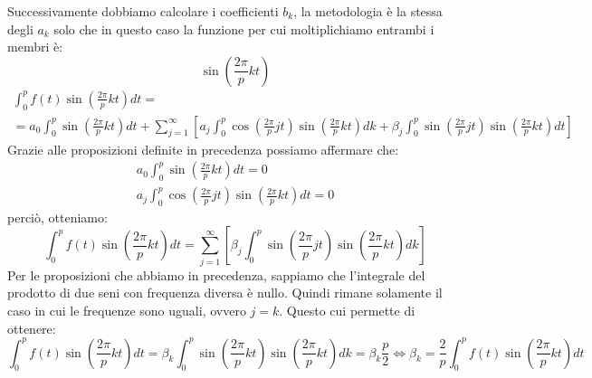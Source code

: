 Successivamente dobbiamo calcolare i coefficienti $b_k$, la metodologia è la stessa
degli $a_k$ solo che in questo caso la funzione per cui moltiplichiamo entrambi
i membri è:
\begin{equation*}
    \sin\left(\frac{2\pi}{p}kt\right)
\end{equation*}
\begin{equation*}
    \begin{array}{l}
        \int_{0}^{p}f(t)\sin\left(\frac{2\pi}{p}kt\right) dt = \\
        = a_0 \int_{0}^{p} \sin\left(\frac{2\pi}{p}kt\right) dt + \sum_{j=1}^{\infty}
        \left[a_j\int_{0}^{p}\cos \left(\frac{2\pi}{p}jt\right)\sin\left(\frac{2\pi}{p}kt\right)dk
            + \beta_j \int_{0}^{p}\sin\left(\frac{2\pi}{p}jt\right)\sin\left(\frac{2\pi}{p}kt
            \right)dt\right]
    \end{array}
\end{equation*}
Grazie alle proposizioni definite in precedenza possiamo affermare che:
\begin{equation*}
    \begin{array}{c}
        a_0\int_{0}^{p}\sin \left(\frac{2\pi}{p}kt\right)dt = 0 \\
        a_j\int_{0}^{p}\cos\left(\frac{2\pi}{p}jt\right)\sin \left(\frac{2\pi}{p}kt\right)dt=0
    \end{array}
\end{equation*}
perciò, otteniamo:
\begin{equation*}
    \int_{0}^{p}f(t)\sin \left(\frac{2\pi}{p}kt\right) dt = \sum_{j=1}^{\infty}
    \left[\beta_j\int_{0}^{p}\sin \left(\frac{2\pi}{p}jt\right)\sin \left(
        \frac{2\pi}{p}kt\right)dk \right]
\end{equation*}
Per le proposizioni che abbiamo in precedenza, sappiamo che l'integrale del prodotto
di due seni con frequenza diversa è nullo. Quindi rimane solamente il caso in
cui le frequenze sono uguali, ovvero $j=k$. Questo cui permette di ottenere:
\begin{equation*}
    \int_{0}^{p}f(t)\sin \left(\frac{2\pi}{p}kt\right) dt = \beta_k\int_{0}^{p}\sin
    \left(\frac{2\pi}{p}kt\right)\sin \left(\frac{2\pi}{p}kt\right)dk = \beta_k \frac{p}{2}
    \iff \beta_k =\frac{2}{p}  \int_{0}^{p}f(t)\sin \left(\frac{2\pi}{p}kt\right) dt
\end{equation*}

